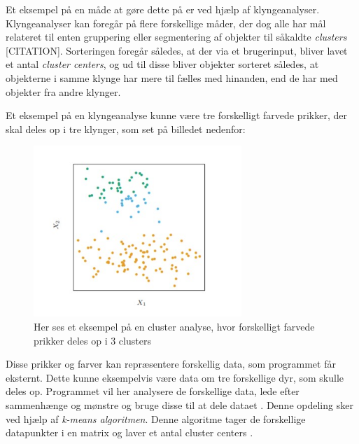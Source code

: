 Et eksempel på en måde at gøre dette på er ved hjælp af klyngeanalyser. Klyngeanalyser kan foregår på flere forskellige måder, der dog alle har mål relateret til enten gruppering eller segmentering af objekter til såkaldte \textit{clusters} [CITATION]. Sorteringen foregår således, at der via et brugerinput, bliver lavet et antal \textit{cluster centers}, og ud til disse bliver objekter sorteret således, at objekterne i samme klynge har mere til fælles med hinanden, end de har med objekter fra andre klynger.
\par
Et eksempel på en klyngeanalyse kunne være tre forskelligt farvede prikker, der skal deles op i tre klynger, som set på billedet nedenfor:
 \begin{figure}[H]
    \centering
    \includegraphics[width=0.7\textwidth]{figures/Cluster.jpg}
    \caption{Her ses et eksempel på en cluster analyse, hvor forskelligt farvede prikker deles op i 3 clusters \cite{Rodriguez-Perez1994}}
    \label{ClusterEksempel}
\end{figure}
Disse prikker og farver kan repræsentere forskellig data, som programmet får eksternt. Dette kunne eksempelvis være data om tre forskellige dyr, som skulle deles op. Programmet vil her analysere de forskellige data, lede efter sammenhænge og mønstre og bruge disse til at dele dataet \cite{Rodriguez-Perez1994}. Denne opdeling sker ved hjælp af \textit{k-means algoritmen}. Denne algoritme tager de forskellige datapunkter i en matrix og laver et antal cluster centers \cite{K-Means}.
\par

